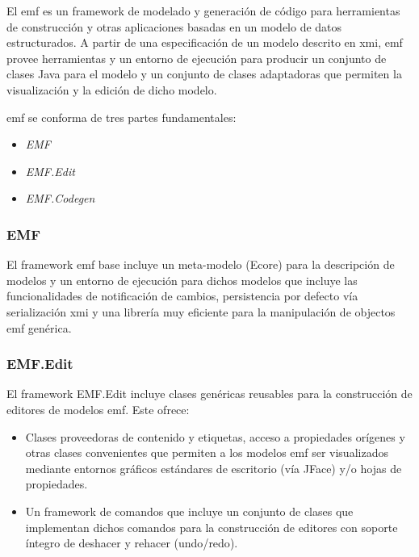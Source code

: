 \documentclass[a4paper,12pt,twoside,spanish,openright]{book}
\begin{document}
El \gls{emf} es un framework de modelado y generación de código para herramientas de construcción y otras aplicaciones basadas en un modelo de datos estructurados. A partir de una especificación de un modelo descrito en \gls{xmi}, \gls{emf} provee herramientas y un entorno de ejecución para producir un conjunto de clases \textsf{Java} para el modelo y un conjunto de clases adaptadoras que permiten la visualización y la edición de dicho modelo.

\gls{emf} se conforma de tres partes fundamentales:

\begin{itemize}
\item \textit{EMF}
\item \textit{EMF.Edit}
\item \textit{EMF.Codegen}
\end{itemize}


\subsubsection{EMF}

El framework \gls{emf} base incluye un meta-modelo (\textsf{Ecore}) para la descripción de modelos y un entorno de ejecución para dichos modelos que incluye las funcionalidades de notificación de cambios, persistencia por defecto vía serialización \gls{xmi} y una librería muy eficiente para la manipulación de objectos \gls{emf} genérica.

\subsubsection{EMF.Edit}

El framework EMF.Edit incluye clases genéricas reusables para la construcción de editores de modelos \gls{emf}. Este ofrece:

\begin{itemize}

\item Clases proveedoras de contenido y etiquetas, acceso a propiedades orígenes y otras clases convenientes que permiten a los modelos \gls{emf} ser visualizados mediante entornos gráficos estándares de escritorio (vía \textsf{JFace}) y/o hojas de propiedades.

\item Un framework de comandos que incluye un conjunto de clases que implementan dichos comandos para la construcción de editores con soporte íntegro de deshacer y rehacer (\textsf{undo}/\textsf{redo}).

\end{itemize}
\end{document}
